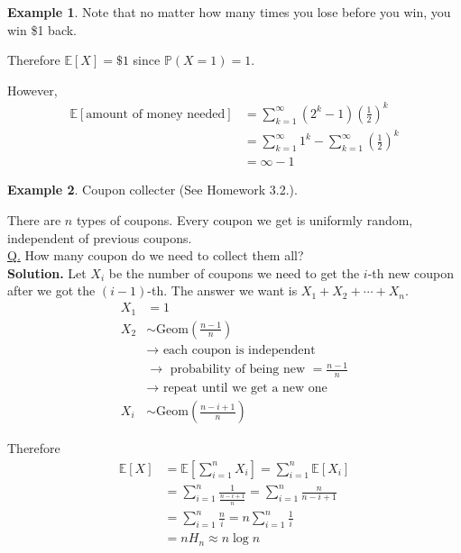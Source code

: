 \documentclass[a4paper,11pt]{amsbook}
\theoremstyle{definition}
\newtheorem{example}{\hspace{-2em} \color{darkblue} Example}[chapter]
\theoremstyle{remark}
\newcommand{\E}{\mathbb{E}}
\renewcommand{\P}{\mathbb{P}}
\newcommand\0{\varnothing}
\newcommand\Geom{\text{Geom}}
\begin{document}
\begin{example}
        Note that no matter how many times you lose before you win, you win \$1 back.

        Therefore $\E[X]=\$1$ since $\P(X=1)=1$.

        However, \begin{align*}
            \E[\text{amount of money needed}]&=\sum_{k=1}^\infty(2^k-1)\left(\frac12\right)^k \\
            &=\sum_{k=1}^\infty1^k-\sum_{k=1}^\infty\left(\frac12\right)^k \\
            &=\infty-1
        \end{align*}
    \end{example}

    \begin{example}
        Coupon collecter (See Homework 3.2.).

        There are $n$ types of coupons. Every coupon we get is uniformly random, independent of previous coupons.\\
        \underline{Q.} How many coupon do we need to collect them all?\\
        \textbf{Solution.} Let $X_i$ be the number of coupons we need to get the $i$-th new coupon after we got the $(i-1)$-th.
        The answer we want is $X_1+X_2+\cdots+X_n$.
        \begin{align*}
            X_1&=1 \tag{first coupon is always new} \\
            X_2&\sim\Geom\left(\frac{n-1}n\right) \\
            &\to\text{ each coupon is independent} \\
            &\to\text{ probability of being new }=\frac{n-1}{n} \\
            &\to\text{ repeat until we get a new one} \\
            X_i&\sim\Geom\left(\frac{n-i+1}{n}\right)
        \end{align*}

        Therefore \begin{align*}
            \E[X]&=\E\left[\sum_{i=1}^nX_i\right]=\sum_{i=1}^n\E[X_i] \tag{LoE} \\
            &=\sum_{i=1}^n\frac{1}{\frac{n-i+1}{n}}
            =\sum_{i=1}^n\frac{n}{n-i+1} \\
            &=\sum_{i=1}^n\frac{n}{i}
            =n\sum_{i=1}^n\frac{1}{i} \\
            &=nH_n\approx n\log n
        \end{align*}
    \end{example}
\end{document}
